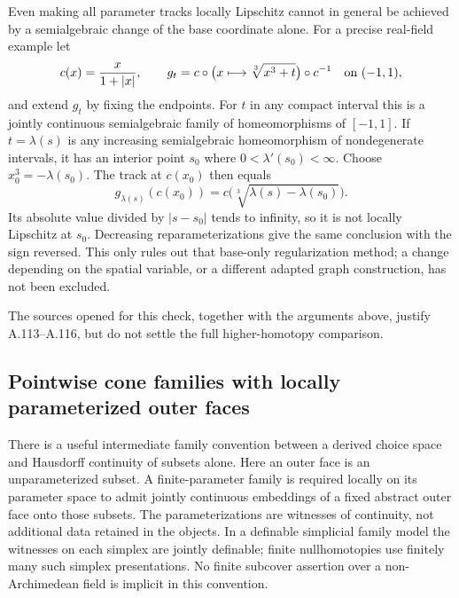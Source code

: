 Even making all parameter tracks locally Lipschitz cannot in general
be achieved by a semialgebraic change of the base coordinate alone.
For a precise real-field example let
\[
 c(x)=\frac{x}{1+|x|},\qquad
 g_t=c\circ\bigl(x\longmapsto\sqrt[3]{x^3+t}\bigr)\circ c^{-1}
       \quad\hbox{on }(-1,1),
\]
and extend $g_t$ by fixing the endpoints. For $t$ in any compact
interval this is a jointly continuous semialgebraic family of
homeomorphisms of $[-1,1]$. If $t=\lambda(s)$ is any increasing
semialgebraic homeomorphism of nondegenerate intervals, it has an
interior point $s_0$ where $0<\lambda'(s_0)<\infty$.
Choose $x_0^3=-\lambda(s_0)$. The track at $c(x_0)$ then equals
\[
 g_{\lambda(s)}(c(x_0))
      =c\bigl(\sqrt[3]{\lambda(s)-\lambda(s_0)}\bigr).
\]
Its absolute value divided by $|s-s_0|$ tends to infinity, so it is
not locally Lipschitz at $s_0$. Decreasing reparameterizations give
the same conclusion with the sign reversed. This only rules out
that base-only regularization method; a change depending on the
spatial variable, or a different adapted graph construction, has
not been excluded.

The sources opened for this check, together with the arguments above, justify
A.113--A.116, but do not
settle the full higher-homotopy comparison.

\subsection{Pointwise cone families with locally parameterized outer faces}

There is a useful intermediate family convention between a derived
choice space and Hausdorff continuity of subsets alone. Here an outer
face is an unparameterized subset. A finite-parameter family is required
locally on its parameter space to admit jointly continuous embeddings
of a fixed abstract outer face onto those subsets. The parameterizations
are witnesses of continuity, not additional data retained in the objects.
In a definable simplicial family model the witnesses on each simplex
are jointly definable; finite nullhomotopies use finitely many such
simplex presentations. No finite subcover assertion over a
non-Archimedean field is implicit in this convention.

